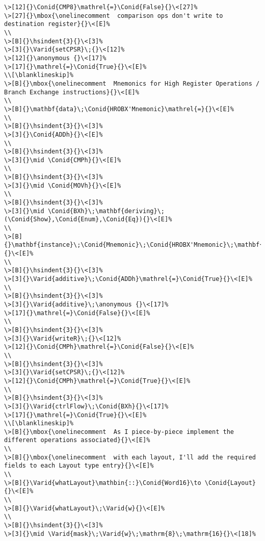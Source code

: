 \documentclass{article}
\makeatletter
\newcommand{\Conid}[1]{\mathit{#1}}
\newcommand{\Varid}[1]{\mathit{#1}}
\newcommand{\anonymous}{\kern0.06em \vbox{\hrule\@width.5em}}
\newlength{\blanklineskip}
\newcommand{\hsindent}[1]{\quad}%
\makeatother
\begin{document}
\begin{Verbatim}[fontsize=\scriptsize]
\>[12]{}\Conid{CMP8}\mathrel{=}\Conid{False}{}\<[27]%
\>[27]{}\mbox{\onelinecomment  comparison ops don't write to destination register}{}\<[E]%
\\
\>[B]{}\hsindent{3}{}\<[3]%
\>[3]{}\Varid{setCPSR}\;{}\<[12]%
\>[12]{}\anonymous {}\<[17]%
\>[17]{}\mathrel{=}\Conid{True}{}\<[E]%
\\[\blanklineskip]%
\>[B]{}\mbox{\onelinecomment  Mnemonics for High Register Operations / Branch Exchange instructions}{}\<[E]%
\\
\>[B]{}\mathbf{data}\;\Conid{HROBX'Mnemonic}\mathrel{=}{}\<[E]%
\\
\>[B]{}\hsindent{3}{}\<[3]%
\>[3]{}\Conid{ADDh}{}\<[E]%
\\
\>[B]{}\hsindent{3}{}\<[3]%
\>[3]{}\mid \Conid{CMPh}{}\<[E]%
\\
\>[B]{}\hsindent{3}{}\<[3]%
\>[3]{}\mid \Conid{MOVh}{}\<[E]%
\\
\>[B]{}\hsindent{3}{}\<[3]%
\>[3]{}\mid \Conid{BXh}\;\mathbf{deriving}\;(\Conid{Show},\Conid{Enum},\Conid{Eq}){}\<[E]%
\\
\>[B]{}\mathbf{instance}\;\Conid{Mnemonic}\;\Conid{HROBX'Mnemonic}\;\mathbf{where}{}\<[E]%
\\
\>[B]{}\hsindent{3}{}\<[3]%
\>[3]{}\Varid{additive}\;\Conid{ADDh}\mathrel{=}\Conid{True}{}\<[E]%
\\
\>[B]{}\hsindent{3}{}\<[3]%
\>[3]{}\Varid{additive}\;\anonymous {}\<[17]%
\>[17]{}\mathrel{=}\Conid{False}{}\<[E]%
\\
\>[B]{}\hsindent{3}{}\<[3]%
\>[3]{}\Varid{writeR}\;{}\<[12]%
\>[12]{}\Conid{CMPh}\mathrel{=}\Conid{False}{}\<[E]%
\\
\>[B]{}\hsindent{3}{}\<[3]%
\>[3]{}\Varid{setCPSR}\;{}\<[12]%
\>[12]{}\Conid{CMPh}\mathrel{=}\Conid{True}{}\<[E]%
\\
\>[B]{}\hsindent{3}{}\<[3]%
\>[3]{}\Varid{ctrlFlow}\;\Conid{BXh}{}\<[17]%
\>[17]{}\mathrel{=}\Conid{True}{}\<[E]%
\\[\blanklineskip]%
\>[B]{}\mbox{\onelinecomment  As I piece-by-piece implement the different operations associated}{}\<[E]%
\\
\>[B]{}\mbox{\onelinecomment  with each layout, I'll add the required fields to each Layout type entry}{}\<[E]%
\\
\>[B]{}\Varid{whatLayout}\mathbin{::}\Conid{Word16}\to \Conid{Layout}{}\<[E]%
\\
\>[B]{}\Varid{whatLayout}\;\Varid{w}{}\<[E]%
\\
\>[B]{}\hsindent{3}{}\<[3]%
\>[3]{}\mid \Varid{mask}\;\Varid{w}\;\mathrm{8}\;\mathrm{16}{}\<[18]%

\end{Verbatim}
\end{document}

